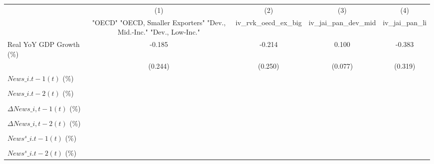 {
\def\sym#1{\ifmmode^{#1}\else\(^{#1}\)\fi}
\begin{tabular}{l*{4}{c}}
\toprule
                    &\multicolumn{1}{c}{(1)}&\multicolumn{1}{c}{(2)}&\multicolumn{1}{c}{(3)}&\multicolumn{1}{c}{(4)}\\
                    &\multicolumn{1}{c}{ "OECD" "OECD, Smaller Exporters" "Dev., Mid.-Inc." "Dev., Low-Inc."}&\multicolumn{1}{c}{iv\_rvk\_oecd\_ex\_big}&\multicolumn{1}{c}{iv\_jai\_pan\_dev\_mid}&\multicolumn{1}{c}{iv\_jai\_pan\_li}\\
\midrule
Real YoY GDP Growth (\%)&      -0.185         &      -0.214         &       0.100         &      -0.383         \\
                    &     (0.244)         &     (0.250)         &     (0.077)         &     (0.319)         \\
\addlinespace
$ News\_{i.t-1}(t)$ (\%)&                     &                     &                     &                     \\
                    &                     &                     &                     &                     \\
\addlinespace
$ News\_{i.t-2}(t)$ (\%)&                     &                     &                     &                     \\
                    &                     &                     &                     &                     \\
\addlinespace
$ \Delta News\_{i,t-1}(t)$ (\%)&                     &                     &                     &                     \\
                    &                     &                     &                     &                     \\
\addlinespace
$ \Delta News\_{i,t-2}(t)$ (\%)&                     &                     &                     &                     \\
                    &                     &                     &                     &                     \\
\addlinespace
$ News^s\_{i.t-1}(t)$ (\%)&                     &                     &                     &                     \\
                    &                     &                     &                     &                     \\
\addlinespace
$ News^s\_{i.t-2}(t)$ (\%)&                     &                     &                     &                     \\

\end{tabular}}
